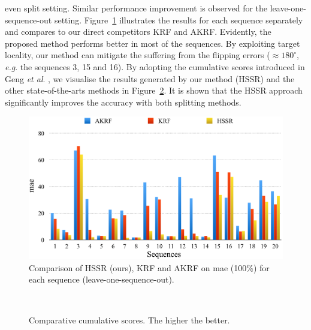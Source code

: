 \documentclass{tutmscthesis}[2010/09/22]
\numberwithin{equation}{section}
\numberwithin{table}{section}
\numberwithin{figure}{section}
\def\onedot{. }
\def\eg{\emph{e.g}\onedot} \def\Eg{\emph{E.g}\onedot}
\def\etal{\emph{et al}\onedot}
\begin{document}
even split setting. Similar performance improvement is observed
for the leave-one-sequence-out setting.
Figure~\ref{Figure1} illustrates the results for each sequence
separately and compares to our direct competitors KRF and AKRF.  
Evidently, the proposed method performs better in most of the
sequences. 
By exploiting target locality, our method can mitigate the suffering
from the flipping errors ($\approx 180^\circ$, \eg the sequences 3, 15
and 16). By adopting the cumulative scores introduced in Geng \etal
\cite{geng2007automatic}, we visualise the results generated by our
method (HSSR) and the other state-of-the-arts methods in Figure~\ref{Fig:cum}. It is shown that the HSSR approach significantly improves the accuracy
with both splitting methods.  

\begin{figure}[t]
\centering
\includegraphics[width=0.98\linewidth]{figure2}
\caption{Comparison of HSSR (ours), KRF and AKRF on mae (100\%) for each sequence (leave-one-sequence-out).}\label{Figure1} 
\end{figure}
%
\begin{figure}[t]
\centering
{}~~~~
\caption{Comparative cumulative scores. The higher the better.}
\label{Fig:cum}
\end{figure}
\end{document}

